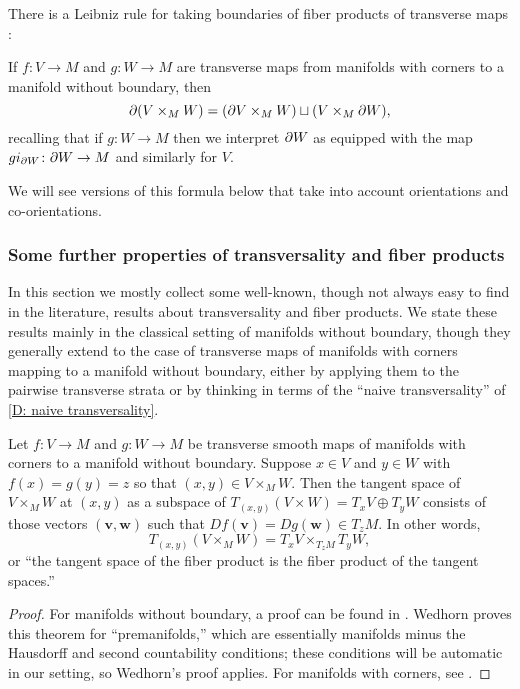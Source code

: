 There is a Leibniz rule for taking boundaries of fiber products of transverse maps \cite[Proposition~6.7]{Joy12}:

\begin{proposition}\label{P: product boundary}
	If $f \colon V \to M$ and $g \colon W \to M$ are transverse maps from manifolds with corners to a manifold without boundary, then
	\[
	\partial(V \times_M W) = (\partial V \times_M W) \sqcup (V \times_M \partial W),
	\]
	recalling that if $g \colon W \to M$ then we interpret $\partial W$ as equipped with the map $gi_{\partial W} \colon \partial W \to M$ and similarly for $V$.
\end{proposition}

We will see versions of this formula below that take into account orientations and co-orientations.

\subsubsection{Some further properties of transversality and fiber products}

In this section we mostly collect some well-known, though not always easy to find in the literature, results about transversality and fiber products.
We state these results mainly in the classical setting of manifolds without boundary, though they generally extend to the case of transverse maps of manifolds with corners mapping to a manifold without boundary, either by applying them to the pairwise transverse strata or by thinking in terms of the ``naive transversality'' of \cref{D: naive transversality}.

\begin{lemma}\label{L: tangent of pullbacks}
	Let $f \colon V \to M$ and $g \colon W \to M$ be transverse smooth maps of manifolds with corners to a manifold without boundary.
	Suppose $x \in V$ and $y \in W$ with $f(x) = g(y) = z$ so that $(x,y) \in V \times_MW$.
	Then the tangent space of $V \times_MW$ at $(x,y)$ as a subspace of $T_{(x,y)}(V \times W) = T_xV \oplus T_yW$ consists of those vectors $(\mathbf v,\mathbf w)$ such that $Df(\mathbf v) = Dg(\mathbf w) \in T_zM$.
	In other words,
	$$T_{(x,y)}(V \times_M W) = T_xV \times_{T_zM} T_yW,$$
	or ``the tangent space of the fiber product is the fiber product of the tangent spaces.''
\end{lemma}

\begin{proof}
For manifolds without boundary, a proof can be found in \cite[Theorem 5.47]{Wed16}.
Wedhorn proves this theorem for ``premanifolds,'' which are essentially manifolds minus the Hausdorff and second countability conditions; these conditions will be automatic in our setting, so Wedhorn's proof applies.
For manifolds with corners, see \cite[Proposition 7.2.7.c]{MaDo92}.
\end{proof}

